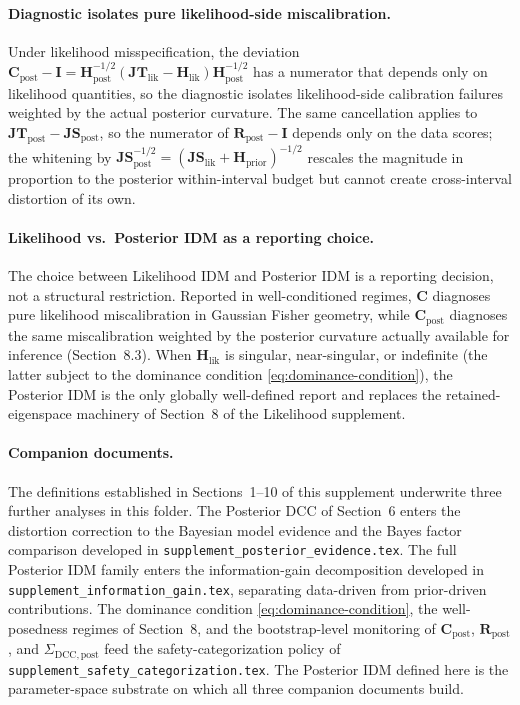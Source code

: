 \documentclass[11pt]{article}
\begin{document}
\paragraph{Diagnostic isolates pure likelihood-side miscalibration.}
Under likelihood misspecification, the deviation $\mathbf C_{\mathrm{post}} - \mathbf I = \mathbf H_{\mathrm{post}}^{-1/2}(\mathbf{JT}_{\mathrm{lik}} - \mathbf H_{\mathrm{lik}})\mathbf H_{\mathrm{post}}^{-1/2}$ has a numerator that depends only on likelihood quantities, so the diagnostic isolates likelihood-side calibration failures weighted by the actual posterior curvature. The same cancellation applies to $\mathbf{JT}_{\mathrm{post}} - \mathbf{JS}_{\mathrm{post}}$, so the numerator of $\mathbf R_{\mathrm{post}} - \mathbf I$ depends only on the data scores; the whitening by $\mathbf{JS}_{\mathrm{post}}^{-1/2} = (\mathbf{JS}_{\mathrm{lik}} + \mathbf H_{\mathrm{prior}})^{-1/2}$ rescales the magnitude in proportion to the posterior within-interval budget but cannot create cross-interval distortion of its own.

\paragraph{Likelihood vs.\ Posterior IDM as a reporting choice.}
The choice between Likelihood IDM and Posterior IDM is a reporting decision, not a structural restriction. Reported in well-conditioned regimes, $\mathbf C$ diagnoses pure likelihood miscalibration in Gaussian Fisher geometry, while $\mathbf C_{\mathrm{post}}$ diagnoses the same miscalibration weighted by the posterior curvature actually available for inference (Section~8.3). When $\mathbf H_{\mathrm{lik}}$ is singular, near-singular, or indefinite (the latter subject to the dominance condition \eqref{eq:dominance-condition}), the Posterior IDM is the only globally well-defined report and replaces the retained-eigenspace machinery of Section~8 of the Likelihood supplement.

\paragraph{Companion documents.}
The definitions established in Sections~1--10 of this supplement underwrite three further analyses in this folder. The Posterior DCC of Section~6 enters the distortion correction to the Bayesian model evidence and the Bayes factor comparison developed in \texttt{supplement\_posterior\_evidence.tex}. The full Posterior IDM family enters the information-gain decomposition developed in \texttt{supplement\_information\_gain.tex}, separating data-driven from prior-driven contributions. The dominance condition \eqref{eq:dominance-condition}, the well-posedness regimes of Section~8, and the bootstrap-level monitoring of $\mathbf C_{\mathrm{post}}$, $\mathbf R_{\mathrm{post}}$, and $\Sigma_{\mathrm{DCC},\mathrm{post}}$ feed the safety-categorization policy of \texttt{supplement\_safety\_categorization.tex}. The Posterior IDM defined here is the parameter-space substrate on which all three companion documents build.
\end{document}
